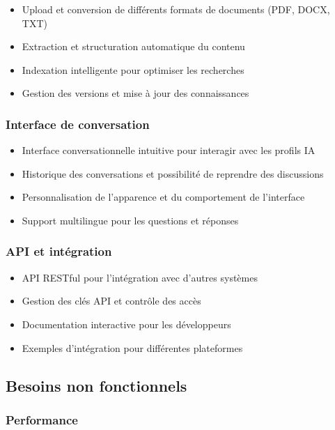 \begin{itemize}
  \item Upload et conversion de différents formats de documents (PDF, DOCX, TXT)
  \item Extraction et structuration automatique du contenu
  \item Indexation intelligente pour optimiser les recherches
  \item Gestion des versions et mise à jour des connaissances
\end{itemize}

\subsubsection{Interface de conversation}

\begin{itemize}
  \item Interface conversationnelle intuitive pour interagir avec les profils IA
  \item Historique des conversations et possibilité de reprendre des discussions
  \item Personnalisation de l'apparence et du comportement de l'interface
  \item Support multilingue pour les questions et réponses
\end{itemize}

\subsubsection{API et intégration}

\begin{itemize}
  \item API RESTful pour l'intégration avec d'autres systèmes
  \item Gestion des clés API et contrôle des accès
  \item Documentation interactive pour les développeurs
  \item Exemples d'intégration pour différentes plateformes
\end{itemize}

\subsection{Besoins non fonctionnels}

\subsubsection{Performance}

